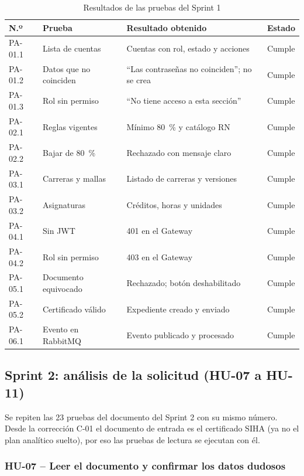 \begin{table}[H]\centering\small
\begin{tabularx}{\textwidth}{|l|X|X|l|}\hline
\rowcolor{grisTarjeta}\textbf{N.º} & \textbf{Prueba} & \textbf{Resultado obtenido} & \textbf{Estado}\\\hline
PA-01.1 & Lista de cuentas & Cuentas con rol, estado y acciones & Cumple\\\hline
PA-01.2 & Datos que no coinciden & ``Las contraseñas no coinciden''; no se crea & Cumple\\\hline
PA-01.3 & Rol sin permiso & ``No tiene acceso a esta sección'' & Cumple\\\hline
PA-02.1 & Reglas vigentes & Mínimo 80~\% y catálogo RN & Cumple\\\hline
PA-02.2 & Bajar de 80~\% & Rechazado con mensaje claro & Cumple\\\hline
PA-03.1 & Carreras y mallas & Listado de carreras y versiones & Cumple\\\hline
PA-03.2 & Asignaturas & Créditos, horas y unidades & Cumple\\\hline
PA-04.1 & Sin JWT & 401 en el Gateway & Cumple\\\hline
PA-04.2 & Rol sin permiso & 403 en el Gateway & Cumple\\\hline
PA-05.1 & Documento equivocado & Rechazado; botón deshabilitado & Cumple\\\hline
PA-05.2 & Certificado válido & Expediente creado y enviado & Cumple\\\hline
PA-06.1 & Evento en RabbitMQ & Evento publicado y procesado & Cumple\\\hline
\end{tabularx}
\caption{Resultados de las pruebas del Sprint 1}
\end{table}

\clearpage
\subsection{Sprint 2: análisis de la solicitud (HU-07 a HU-11)}

Se repiten las 23 pruebas del documento del Sprint 2 con su mismo número. Desde la corrección C-01 el documento de
entrada es el certificado SIHA (ya no el plan analítico suelto), por eso las pruebas de lectura se ejecutan con él.

\subsubsection{HU-07 -- Leer el documento y confirmar los datos dudosos}

